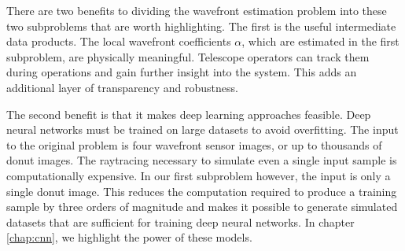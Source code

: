 There are two benefits to dividing the wavefront estimation problem into these two subproblems that are worth highlighting. The first is the useful intermediate data products. The local wavefront coefficients $\alpha$, which are estimated in the first subproblem, are physically meaningful. Telescope operators can track them during operations and gain further insight into the system. This adds an additional layer of transparency and robustness.

The second benefit is that it makes deep learning approaches feasible. Deep neural networks must be trained on large datasets to avoid overfitting. The input to the original problem is four wavefront sensor images, or up to thousands of donut images. The raytracing necessary to simulate even a single input sample is computationally expensive. In our first subproblem however, the input is only a single donut image. This reduces the computation required to produce a training sample by three orders of magnitude and makes it possible to generate simulated datasets that are sufficient for training deep neural networks. In chapter \ref{chap:cnn}, we highlight the power of these models.

